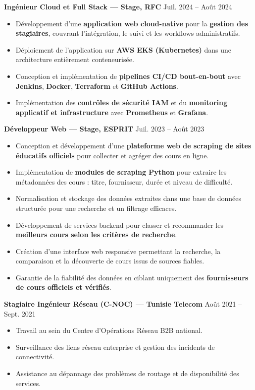 \documentclass[10pt, letterpaper]{article}
\newenvironment{highlights}{
\begin{itemize}[leftmargin=12pt, itemsep=2pt]
}{
\end{itemize}
}
\begin{document}
\textbf{Ingénieur Cloud et Full Stack --- Stage, RFC} \hfill Juil. 2024 -- Août 2024
\begin{highlights}
\item Développement d'une \textbf{application web cloud-native} pour la \textbf{gestion des stagiaires}, couvrant l'intégration, le suivi et les workflows administratifs.
\item Déploiement de l'application sur \textbf{AWS EKS (Kubernetes)} dans une architecture entièrement conteneurisée.
\item Conception et implémentation de \textbf{pipelines CI/CD bout-en-bout} avec \textbf{Jenkins}, \textbf{Docker}, \textbf{Terraform} et \textbf{GitHub Actions}.
\item Implémentation des \textbf{contrôles de sécurité IAM} et du \textbf{monitoring applicatif et infrastructure} avec \textbf{Prometheus} et \textbf{Grafana}.
\end{highlights}

\textbf{Développeur Web --- Stage, ESPRIT} \hfill Juil. 2023 -- Août 2023
\begin{highlights}
\item Conception et développement d'une \textbf{plateforme web de scraping de sites éducatifs officiels} pour collecter et agréger des cours en ligne.
\item Implémentation de \textbf{modules de scraping Python} pour extraire les métadonnées des cours : titre, fournisseur, durée et niveau de difficulté.
\item Normalisation et stockage des données extraites dans une base de données structurée pour une recherche et un filtrage efficaces.
\item Développement de services backend pour classer et recommander les \textbf{meilleurs cours selon les critères de recherche}.
\item Création d'une interface web responsive permettant la recherche, la comparaison et la découverte de cours issus de sources fiables.
\item Garantie de la fiabilité des données en ciblant uniquement des \textbf{fournisseurs de cours officiels et vérifiés}.
\end{highlights}

\textbf{Stagiaire Ingénieur Réseau (C-NOC) --- Tunisie Telecom} \hfill Août 2021 -- Sept. 2021
\begin{highlights}
\item Travail au sein du Centre d'Opérations Réseau B2B national.
\item Surveillance des liens réseau enterprise et gestion des incidents de connectivité.
\item Assistance au dépannage des problèmes de routage et de disponibilité des services.
\end{highlights}
\end{document}
